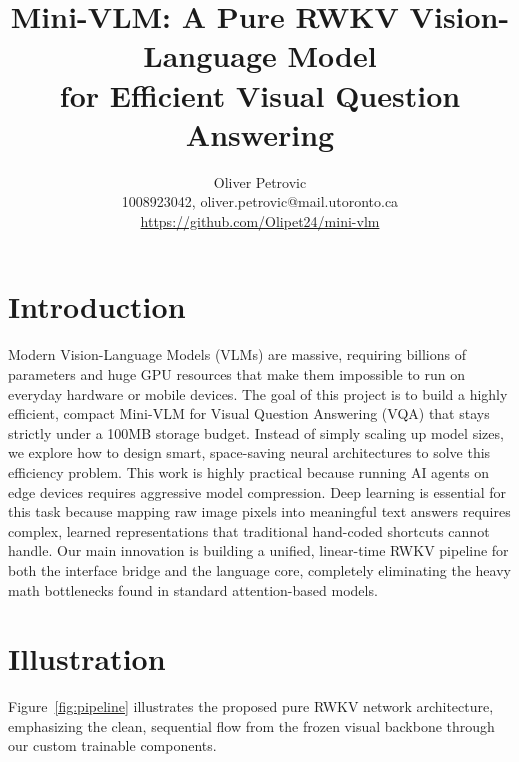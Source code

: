 \documentclass[final]{article}
\title{Mini-VLM: A Pure RWKV Vision-Language Model\\for Efficient Visual Question Answering}
\author{%
  Oliver Petrovic \\
  1008923042, oliver.petrovic@mail.utoronto.ca\\
  \url{https://github.com/Olipet24/mini-vlm}\\
}
\begin{document}
\maketitle

\vspace{-0.5in}

\section*{Introduction}

Modern Vision-Language Models (VLMs) are massive, requiring billions of parameters and huge
GPU resources that make them impossible to run on everyday hardware or mobile devices. The goal
of this project is to build a highly efficient, compact Mini-VLM for Visual Question Answering
(VQA) that stays strictly under a 100MB storage budget. Instead of simply scaling up model
sizes, we explore how to design smart, space-saving neural architectures to solve this
efficiency problem. This work is highly practical because running AI agents on edge devices
requires aggressive model compression. Deep learning is essential for this task because mapping
raw image pixels into meaningful text answers requires complex, learned representations that
traditional hand-coded shortcuts cannot handle. Our main innovation is building a unified,
linear-time RWKV pipeline for both the interface bridge and the language core, completely
eliminating the heavy math bottlenecks found in standard attention-based models.

\section*{Illustration}

Figure~\ref{fig:pipeline} illustrates the proposed pure RWKV network architecture, emphasizing
the clean, sequential flow from the frozen visual backbone through our custom trainable
components.
\end{document}
